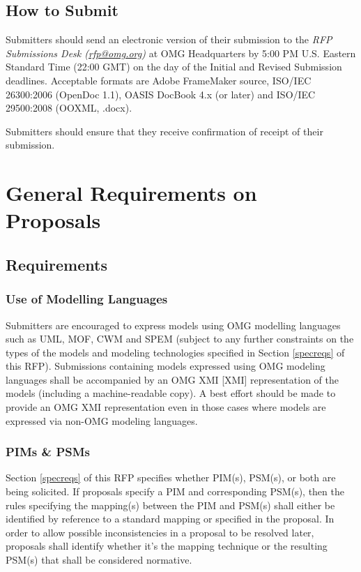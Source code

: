 \subsection{How to Submit}

Submitters should send an electronic version of their submission to the \textit{RFP Submissions Desk (\href{mailto:rfp@omg.org}{rfp@omg.org}) }at OMG Headquarters by 5:00 PM U.S. Eastern Standard Time (22:00 GMT) on the day of the Initial and Revised Submission deadlines. Acceptable formats are Adobe FrameMaker source, ISO/IEC 26300:2006 (OpenDoc 1.1), OASIS DocBook 4.x (or later) and ISO/IEC 29500:2008 (OOXML, .docx).

Submitters should ensure that they receive confirmation of receipt of their submission.


\section{General Requirements on Proposals}\label{genreq}
\subsection{Requirements}
\subsubsection{Use of Modelling Languages}
Submitters are encouraged to express models using OMG modelling languages such as UML, MOF, CWM and SPEM (subject to any further constraints on the types of the models and modeling technologies specified in Section \ref{specreqs} of this RFP). Submissions containing models expressed using OMG modeling languages shall be accompanied by an OMG XMI [XMI] representation of the models (including a machine-readable copy). A best effort should be made to provide an OMG XMI representation even in those cases where models are expressed via non-OMG modeling languages.
\subsubsection{PIMs \& PSMs}
Section \ref{specreqs} of this RFP specifies whether PIM(s), PSM(s), or both are being solicited. If proposals specify a PIM and corresponding PSM(s), then the rules specifying the mapping(s) between the PIM and PSM(s) shall either be identified by reference to a standard mapping or specified in the proposal. In order to allow possible inconsistencies in a proposal to be resolved later, proposals shall identify whether it's the mapping technique or the resulting PSM(s) that shall be considered normative.
